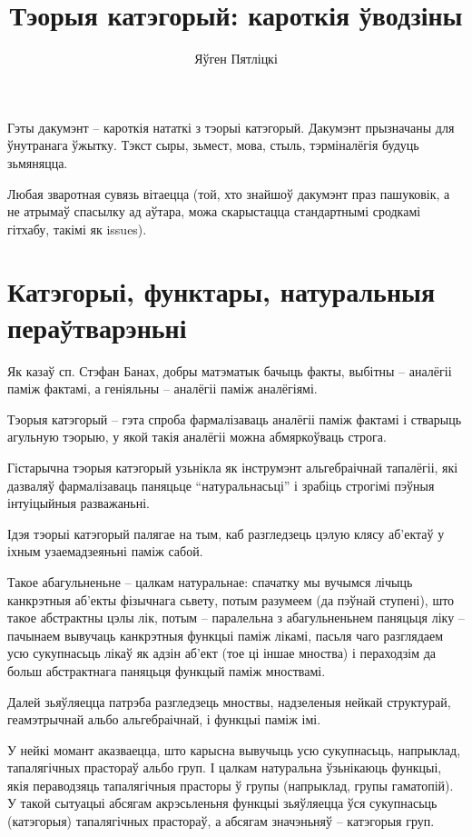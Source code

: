 \documentclass[a4paper,12pt]{book}
\title{Тэорыя катэгорый: кароткія ўводзіны}
\author{Яўген Пятліцкі}
\begin{document}
\maketitle

Гэты дакумэнт -- кароткія нататкі з тэорыі катэгорый. Дакумэнт
прызначаны для ўнутранага ўжытку. Тэкст сыры, зьмест, мова, стыль,
тэрміналёгія будуць зьмяняцца.

Любая зваротная сувязь вітаецца (той, хто знайшоў дакумэнт праз
пашуковік, а не атрымаў спасылку ад аўтара, можа скарыстацца
стандартнымі сродкамі гітхабу, такімі як issues).

\tableofcontents

\chapter{Катэгорыі, функтары, натуральныя пераўтварэньні}

Як казаў сп. Стэфан Банах, добры матэматык бачыць факты, выбітны --
аналёгіі паміж фактамі, а геніяльны -- аналёгіі паміж аналёгіямі.

Тэорыя катэгорый -- гэта спроба фармалізаваць аналёгіі паміж фактамі і
стварыць агульную тэорыю, у якой такія аналёгіі можна абмяркоўваць
строга.

Гістарычна тэорыя катэгорый узьнікла як інструмэнт альгебраічнай
тапалёгіі, які дазваляў фармалізаваць паняцьце ``натуральнасьці'' і
зрабіць строгімі пэўныя інтуіцыйныя разважаньні.

Ідэя тэорыі катэгорый палягае на тым, каб разгледзець цэлую клясу
аб'ектаў у іхным узаемадзеяньні паміж сабой.

Такое абагульненьне -- цалкам натуральнае: спачатку мы вучымся лічыць
канкрэтныя аб'екты фізычнага сьвету, потым разумеем (да пэўнай ступені), што такое
абстрактны цэлы лік, потым -- паралельна з абагульненьнем паняцьця
ліку -- пачынаем вывучаць канкрэтныя функцыі паміж лікамі, пасьля чаго
разглядаем усю сукупнасьць лікаў як адзін аб'ект (тое ці іншае
мноства) і пераходзім да больш абстрактнага паняцьця функцый паміж
мноствамі.

Далей зьяўляецца патрэба разгледзець мноствы, надзеленыя нейкай
структурай, геамэтрычнай альбо альгебраічнай, і функцыі паміж імі.

У нейкі момант аказваецца, што карысна вывучыць усю сукупнасьць,
напрыклад, тапалягічных прастораў альбо груп. І цалкам натуральна
ўзьнікаюць функцыі, якія пераводзяць тапалягічныя прасторы ў групы
(напрыклад, групы гаматопій). У такой сытуацыі абсягам акрэсьленьня
функцыі зьяўляецца ўся сукупнасьць (катэгорыя) тапалягічных прастораў,
а абсягам значэньняў -- катэгорыя груп.
\end{document}
